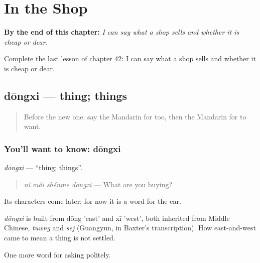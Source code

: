 
\chapter{In the Shop}
\label{ch:zh-in-the-shop}

\begin{chapteropening}
\textbf{By the end of this chapter:} \emph{I can say what a shop sells and whether it is cheap or dear.}

Complete the last lesson of chapter 42: I can say what a shop sells and whether it is cheap or dear.
\end{chapteropening}

\section[dōngxi]{dōngxi — thing; things}

\label{lesson:ZH-C42-dongxi}



\begin{quote}
Before the new one: say the Mandarin for too, then the Mandarin for to want.
\end{quote}

\subsection*{You'll want to know: dōngxi}
\emph{dōngxi} — \textquotedblleft{}thing; things\textquotedblright{}.

\begin{quote}
\emph{nǐ mǎi shénme dōngxi} — What are you buying?
\end{quote}

Its characters come later; for now it is a word for the ear.

\begin{cousinweb}
\emph{dōngxi} is built from dōng 'east' and xī 'west', both inherited from Middle Chinese, \emph{tuwng} and \emph{sej} (Guangyun, in Baxter's transcription). How east-and-west came to mean a thing is not settled.
\end{cousinweb}

\begin{grammarlens}[title={What you've built}]
One more word for asking politely.
\end{grammarlens}

